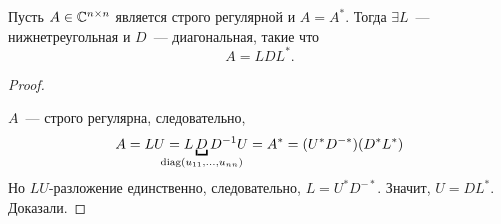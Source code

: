 \begin{corollary}
    Пусть $A \in \mathbb{C}^{n \times n}$ является строго регулярной и $A = A^*$. Тогда $\exists L$~--- нижнетреугольная и $D$~--- диагональная, такие что
    \begin{equation*}
        A = LDL^*.
    \end{equation*}
\end{corollary}
\begin{proof}~

    $A$~--- строго регулярна, следовательно,
    \begin{equation*}
        A = LU = L\underbracket{D}_{\mathclap{\diag(u_{11}, \dots, u_{nn})}}D^{-1}U = A^* = (U^* D^{-*})(D^* L^*)
    \end{equation*}
    Но $LU$-разложение единственно, следовательно, $L = U^*D^{-*}$. Значит, $U = DL^*$. Доказали.

\end{proof}